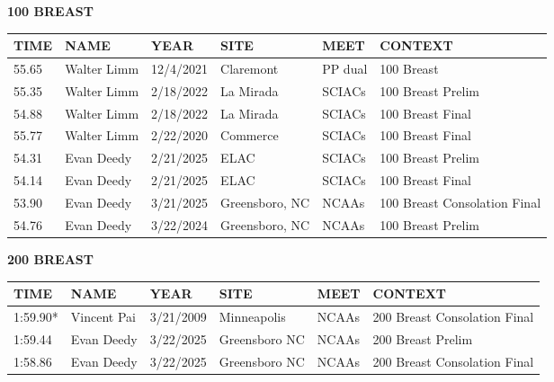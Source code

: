 \vspace{0.4cm}

\begin{minipage}[t]{0.48\textwidth}
\centering
\textbf{100 BREAST}\\[0.05cm]
\begin{tabular}{@{}p{1.8cm}p{2.8cm}p{1.2cm}p{1.4cm}p{1.4cm}p{2.0cm}@{}}
\hline
\textbf{TIME} & \textbf{NAME} & \textbf{YEAR} & \textbf{SITE} & \textbf{MEET} & \textbf{CONTEXT} \\
\hline
55.65 & Walter Limm & 12/4/2021 & Claremont & PP dual & 100 Breast \\
55.35 & Walter Limm & 2/18/2022 & La Mirada & SCIACs & 100 Breast Prelim \\
54.88 & Walter Limm & 2/18/2022 & La Mirada & SCIACs & 100 Breast Final \\
55.77 & Walter Limm & 2/22/2020 & Commerce & SCIACs & 100 Breast Final \\
54.31 & Evan Deedy & 2/21/2025 & ELAC & SCIACs & 100 Breast Prelim \\
54.14 & Evan Deedy & 2/21/2025 & ELAC & SCIACs & 100 Breast Final \\
53.90 & Evan Deedy & 3/21/2025 & Greensboro, NC & NCAAs & 100 Breast Consolation Final \\
54.76 & Evan Deedy & 3/22/2024 & Greensboro, NC & NCAAs & 100 Breast Prelim \\
\hline
\end{tabular}
\end{minipage}\hfill
\begin{minipage}[t]{0.48\textwidth}
\centering
\textbf{200 BREAST}\\[0.05cm]
\begin{tabular}{@{}p{1.8cm}p{2.8cm}p{1.2cm}p{1.4cm}p{1.4cm}p{2.0cm}@{}}
\hline
\textbf{TIME} & \textbf{NAME} & \textbf{YEAR} & \textbf{SITE} & \textbf{MEET} & \textbf{CONTEXT} \\
\hline
1:59.90* & Vincent Pai & 3/21/2009 & Minneapolis & NCAAs & 200 Breast Consolation Final \\
1:59.44 & Evan Deedy & 3/22/2025 & Greensboro NC & NCAAs & 200 Breast Prelim \\
1:58.86 & Evan Deedy & 3/22/2025 & Greensboro NC & NCAAs & 200 Breast Consolation Final \\
\hline
\end{tabular}
\end{minipage}

\vspace{0.4cm}

